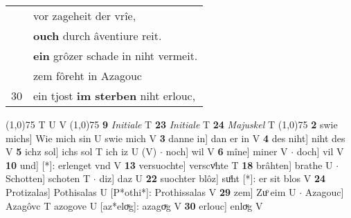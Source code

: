 \documentclass[8pt,a4paper,notitlepage]{article}
\begin{document}
\begin{table}[ht]
\begin{minipage}[t]{0.5\linewidth}
\begin{tabular}{rl}
 & vor zageheit der vrîe,\\ 
 & \textbf{ouch} durch âventiure reit.\\ 
 & \textbf{ein} grôzer schade in niht vermeit.\\ 
 & zem fôreht in Azagouc\\ 
30 & ein tjost \textbf{im sterben} niht erlouc,\\ 
\end{tabular}
\scriptsize
\line(1,0){75} \newline
T U V \newline
\line(1,0){75} \newline
\textbf{9} \textit{Initiale} T  \textbf{23} \textit{Initiale} T  \textbf{24} \textit{Majuskel} T  \newline
\line(1,0){75} \newline
\textbf{2} swie michs] Wie mich sin U swie mich V \textbf{3} danne in] dan er in V \textbf{4} des niht] niht des V \textbf{5} ichz sol] ichs sol T ich iz U (V)  $\cdot$ noch] wil V \textbf{6} mîne] miner V  $\cdot$ doch] vil V \textbf{10} und] [*]: erlenget vnd V \textbf{13} versuochte] verscvͦhte T \textbf{18} brâhten] brathe U  $\cdot$ Schotten] schoten T  $\cdot$ diz] daz U \textbf{22} suochter blôz] suͦht [*]: er sit blos V \textbf{24} Protizalas] Pothisalas U [P*othi*]: Prothissalas V \textbf{29} zem] Zuͦ eim U  $\cdot$ Azagouc] Azagôvc T azogove U [az*eloͮg]: azagoͮg V \textbf{30} erlouc] enloͮg V \newline
\end{minipage}
\end{table}
\end{document}
